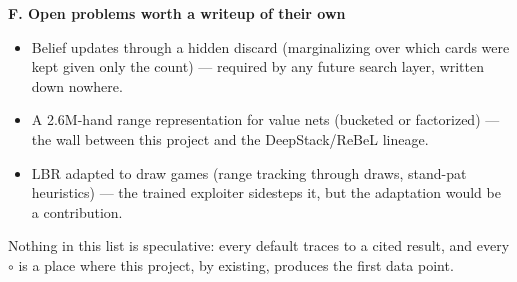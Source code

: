 \textbf{F. Open problems worth a writeup of their own}
\begin{itemize}
\item[$\circ$] Belief updates through a hidden discard (marginalizing over which cards were kept given only the count) --- required by any future search layer, written down nowhere.
\item[$\circ$] A 2.6M-hand range representation for value nets (bucketed or factorized) --- the wall between this project and the DeepStack/ReBeL lineage.
\item[$\circ$] LBR adapted to draw games (range tracking through draws, stand-pat heuristics) --- the trained exploiter sidesteps it, but the adaptation would be a contribution.
\end{itemize}

Nothing in this list is speculative: every default traces to a cited result, and every $\circ$ is a place where this project, by existing, produces the first data point.
